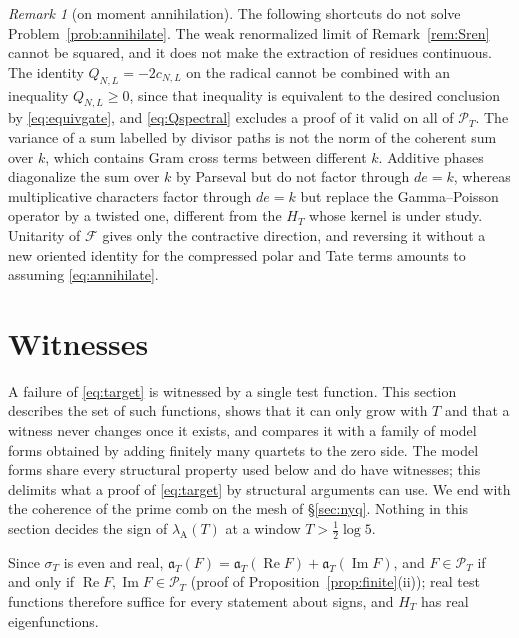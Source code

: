 \documentclass[11pt]{amsart}
\theoremstyle{definition}
\theoremstyle{remark}
\newtheorem{remark}[theorem]{Remark}
\newcommand{\Rel}{\operatorname{Re}}
\newcommand{\Iml}{\operatorname{Im}}
\newcommand{\PT}{\mathcal P_T}
\newcommand{\lamA}{\lambda_{\mathrm A}(T)}
\newcommand{\sT}{\sigma_T}
\begin{document}
\begin{remark}[on moment annihilation]\label{rem:returnremarks}
The following shortcuts do not solve Problem~\ref{prob:annihilate}. The weak renormalized limit of
Remark~\ref{rem:Sren} cannot be squared, and it does not make the extraction of residues continuous. The identity
$Q_{N,L}=-2c_{N,L}$ on the radical cannot be combined with an inequality $Q_{N,L}\ge0$, since that inequality is
equivalent to the desired conclusion by \eqref{eq:equivgate}, and \eqref{eq:Qspectral} excludes a proof of it valid on all
of $\PT$. The variance of a sum labelled by divisor paths is not the norm of the coherent sum over $k$, which contains
Gram cross terms between different $k$. Additive phases diagonalize the sum over $k$ by Parseval but do not factor
through $de=k$, whereas multiplicative characters factor through $de=k$ but replace the Gamma--Poisson operator by a
twisted one, different from the $H_T$ whose kernel is under study. Unitarity of $\mathscr F$ gives only the contractive
direction, and reversing it without a new oriented identity for the compressed polar and Tate terms amounts to
assuming \eqref{eq:annihilate}.
\end{remark}


\section{Witnesses}\label{sec:wit}

A failure of \eqref{eq:target} is witnessed by a single test function. This section describes the set of such
functions, shows that it can only grow with $T$ and that a witness never changes once it exists, and compares it
with a family of model forms obtained by adding finitely many quartets to the zero side. The model forms share every
structural property used below and do have witnesses; this delimits what a proof of \eqref{eq:target} by structural
arguments can use. We end with the coherence of the prime comb on the mesh of \S\ref{sec:nyq}. Nothing in this section
decides the sign of $\lamA$ at a window $T>\frac12\log5$.

Since $\sT$ is even and real, $\mathfrak a_T(F)=\mathfrak a_T(\Rel F)+\mathfrak a_T(\Iml F)$, and $F\in\PT$ if and only if
$\Rel F,\Iml F\in\PT$ (proof of Proposition~\ref{prop:finite}(ii)); real test functions therefore suffice for every
statement about signs, and $H_T$ has real eigenfunctions.
\end{document}
